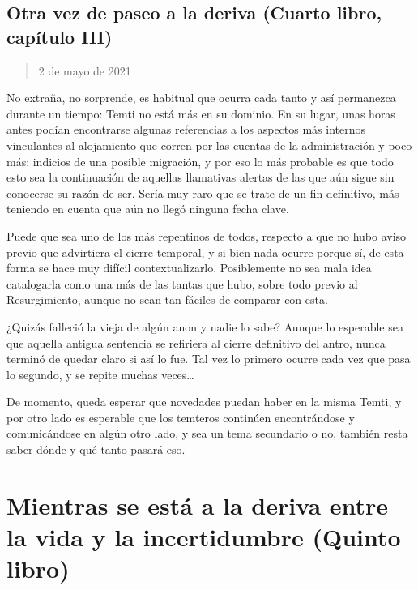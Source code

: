 \documentclass[
  spanish,
]{book}
\begin{document}
\hypertarget{otra-vez-de-paseo-a-la-deriva-cuarto-libro-capuxedtulo-iii}{%
\section{Otra vez de paseo a la deriva (Cuarto libro, capítulo III)}\label{otra-vez-de-paseo-a-la-deriva-cuarto-libro-capuxedtulo-iii}}

\begin{quote}
2 de mayo de 2021
\end{quote}

No extraña, no sorprende, es habitual que ocurra cada tanto y así permanezca durante un tiempo: Temti no está más en su dominio. En su lugar, unas horas antes podían encontrarse algunas referencias a los aspectos más internos vinculantes al alojamiento que corren por las cuentas de la administración y poco más: indicios de una posible migración, y por eso lo más probable es que todo esto sea la continuación de aquellas llamativas alertas de las que aún sigue sin conocerse su razón de ser. Sería muy raro que se trate de un fin definitivo, más teniendo en cuenta que aún no llegó ninguna fecha clave.

Puede que sea uno de los más repentinos de todos, respecto a que no hubo aviso previo que advirtiera el cierre temporal, y si bien nada ocurre porque sí, de esta forma se hace muy difícil contextualizarlo. Posiblemente no sea mala idea catalogarla como una más de las tantas que hubo, sobre todo previo al Resurgimiento, aunque no sean tan fáciles de comparar con esta.

¿Quizás falleció la vieja de algún anon y nadie lo sabe? Aunque lo esperable sea que aquella antigua sentencia se refiriera al cierre definitivo del antro, nunca terminó de quedar claro si así lo fue. Tal vez lo primero ocurre cada vez que pasa lo segundo, y se repite muchas veces\ldots{}

De momento, queda esperar que novedades puedan haber en la misma Temti, y por otro lado es esperable que los temteros continúen encontrándose y comunicándose en algún otro lado, y sea un tema secundario o no, también resta saber dónde y qué tanto pasará eso.

\hypertarget{mientras-se-estuxe1-a-la-deriva-entre-la-vida-y-la-incertidumbre-quinto-libro}{%
\chapter{Mientras se está a la deriva entre la vida y la incertidumbre (Quinto libro)}\label{mientras-se-estuxe1-a-la-deriva-entre-la-vida-y-la-incertidumbre-quinto-libro}}
\end{document}
